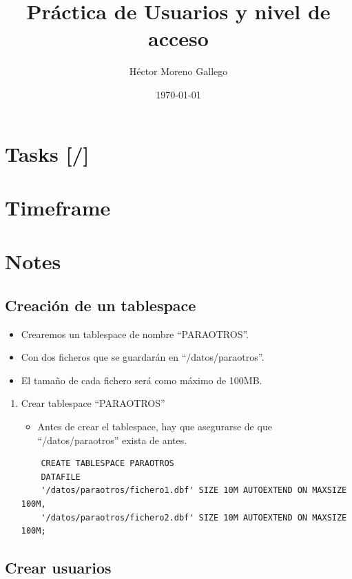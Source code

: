 \documentclass[11pt]{article}
\author{Héctor Moreno Gallego}
\date{\today}
\title{Práctica de Usuarios y nivel de acceso}
\begin{document}
\maketitle
\tableofcontents

\section{Tasks [/]}
\label{sec:orga37a865}
\section{Timeframe}
\label{sec:orgd648d4f}
\section{Notes}
\label{sec:org0286ea5}


\subsection{Creación de un tablespace}
\label{sec:org2651e46}

\begin{itemize}
\item Crearemos un tablespace de nombre ``PARAOTROS''.
\item Con dos ficheros que se guardarán en ``/datos/paraotros''.
\item El tamaño de cada fichero será como máximo de 100MB.
\end{itemize}


\begin{enumerate}
\item Crear tablespace ``PARAOTROS''

\begin{itemize}
\item Antes de crear el tablespace, hay que asegurarse de que ``/datos/paraotros'' exista de antes.
\end{itemize}

\begin{verbatim}
    CREATE TABLESPACE PARAOTROS
    DATAFILE
    '/datos/paraotros/fichero1.dbf' SIZE 10M AUTOEXTEND ON MAXSIZE 100M,
    '/datos/paraotros/fichero2.dbf' SIZE 10M AUTOEXTEND ON MAXSIZE 100M;
\end{verbatim}
\end{enumerate}
\subsection{Crear usuarios}
\label{sec:orgd5298ca}
\end{document}

